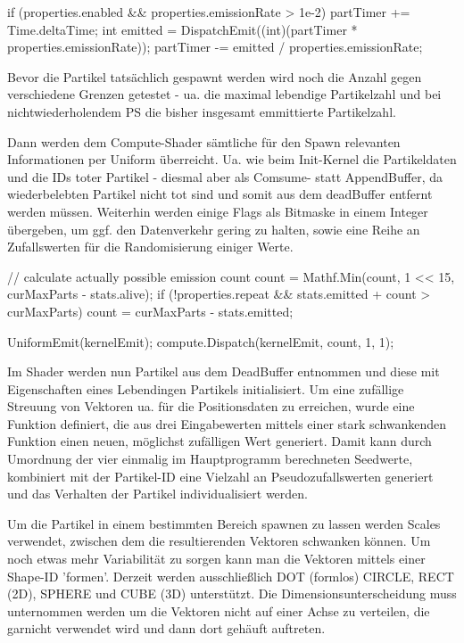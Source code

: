 \begin{csh}[caption=Controller Emission]
if (properties.enabled && properties.emissionRate > 1e-2)
{
    partTimer += Time.deltaTime;
    int emitted = DispatchEmit((int)(partTimer * properties.emissionRate));
    partTimer -= emitted / properties.emissionRate;
}
\end{csh}

Bevor die Partikel tatsächlich gespawnt werden wird noch die Anzahl gegen verschiedene Grenzen getestet - ua. die maximal lebendige Partikelzahl und bei nichtwiederholendem PS die bisher insgesamt emmittierte Partikelzahl.

Dann werden dem Compute-Shader sämtliche für den Spawn relevanten Informationen per Uniform überreicht. Ua. wie beim Init-Kernel die Partikeldaten und die IDs toter Partikel - diesmal aber als Comsume- statt AppendBuffer, da wiederbelebten Partikel nicht tot sind und somit aus dem deadBuffer entfernt werden müssen. Weiterhin werden einige Flags als Bitmaske in einem Integer übergeben, um ggf. den Datenverkehr gering zu halten, sowie eine Reihe an Zufallswerten für die Randomisierung einiger Werte.

\begin{csh}[caption=Controller Emission Dispatch]
// calculate actually possible emission count
count = Mathf.Min(count, 1 << 15, curMaxParts - stats.alive);
if (!properties.repeat && stats.emitted + count > curMaxParts)
    count = curMaxParts - stats.emitted;

UniformEmit(kernelEmit);
compute.Dispatch(kernelEmit, count, 1, 1);
\end{csh}

Im Shader werden nun Partikel aus dem DeadBuffer entnommen und diese mit Eigenschaften eines Lebendingen Partikels initialisiert. Um eine zufällige Streuung von Vektoren ua. für die Positionsdaten zu erreichen, wurde eine Funktion definiert, die aus drei Eingabewerten mittels einer stark schwankenden Funktion einen neuen, möglichst zufälligen Wert generiert. Damit kann durch Umordnung der vier einmalig im Hauptprogramm berechneten Seedwerte, kombiniert mit der Partikel-ID eine Vielzahl an Pseudozufallswerten generiert und das Verhalten der Partikel individualisiert werden.

Um die Partikel in einem bestimmten Bereich spawnen zu lassen werden Scales verwendet, zwischen dem die resultierenden Vektoren schwanken können. Um noch etwas mehr Variabilität zu sorgen kann man die Vektoren mittels einer Shape-ID 'formen'. Derzeit werden ausschlie{\ss}lich DOT (formlos) CIRCLE, RECT (2D), SPHERE und CUBE (3D) unterstützt. Die Dimensionsunterscheidung muss unternommen werden um die Vektoren nicht auf einer Achse zu verteilen, die garnicht verwendet wird und dann dort gehäuft auftreten.

